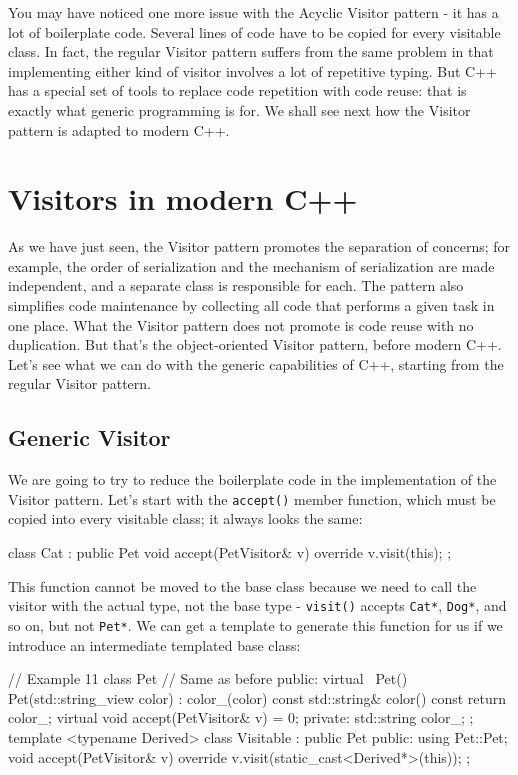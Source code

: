 You may have noticed one more issue with the Acyclic Visitor pattern - it has a lot of boilerplate code. Several lines of code have to be copied for every visitable class. In fact, the regular Visitor pattern suffers from the same problem in that implementing either kind of visitor involves a lot of repetitive typing. But C++ has a special set of tools to replace code repetition with code reuse: that is exactly what generic programming is for. We shall see next how the Visitor pattern is adapted to modern C++.

\section{Visitors in modern C++}

As we have just seen, the Visitor pattern promotes the separation of concerns; for example, the order of serialization and the mechanism of serialization are made independent, and a separate class is responsible for each. The pattern also simplifies code maintenance by collecting all code that performs a given task in one place. What the Visitor pattern does not promote is code reuse with no duplication. But that's the object-oriented Visitor pattern, before modern C++. Let's see what we can do with the generic capabilities of C++, starting from the regular Visitor pattern.

\subsection{Generic Visitor}

We are going to try to reduce the boilerplate code in the implementation of the Visitor pattern. Let's start with the \texttt{accept()} member function, which must be copied into every visitable class; it always looks the same:

\begin{code}
class Cat : public Pet {
  void accept(PetVisitor& v) override { v.visit(this); }
};
\end{code}

This function cannot be moved to the base class because we need to call the visitor with the actual type, not the base type - \texttt{visit()} accepts \texttt{Cat*}, \texttt{Dog*}, and so on, but not \texttt{Pet*}. We can get a template to generate this function for us if we introduce an intermediate templated base class:

\begin{code}
// Example 11
class Pet { // Same as before
  public:
  virtual ~Pet() {}
  Pet(std::string_view color) : color_(color) {}
  const std::string& color() const { return color_; }
  virtual void accept(PetVisitor& v) = 0;
  private:
  std::string color_;
};
template <typename Derived>
class Visitable : public Pet {
  public:
  using Pet::Pet;
  void accept(PetVisitor& v) override {
    v.visit(static_cast<Derived*>(this));
  }
};
\end{code}

